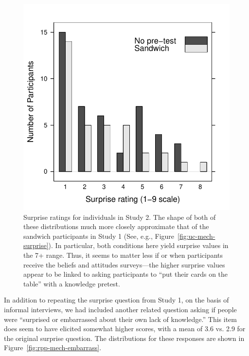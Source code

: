 \begin{figure}
    \centering
    \includegraphics{RPP-mech-surprise-by-group.pdf}
    \caption{Surprise ratings for individuals in Study 2. The shape of both of
        these distributions much more closely approximate that of the sandwich
        participants in Study 1 (See, e.g., Figure~\ref{fig:uc-mech-surprise}).
        In particular, both conditions here yield surprise values in the 7+
        range.  Thus, it seems to matter less if or when participants receive
        the beliefs and attitudes surveys---the higher surprise values appear
        to be linked to asking participants to “put their cards on the table”
        with a knowledge pretest.}
    \label{fig:rpp-mech-surprise}
\end{figure}

In addition to repeating the surprise question from Study 1, on the basis of
informal interviews, we had included another related question asking if people
were “surprised or embarrassed about their own lack of knowledge.” This item
does seem to have elicited somewhat higher scores, with a mean of 3.6 vs. 2.9
for the original surprise question. The distributions for these responses are
shown in Figure~\ref{fig:rpp-mech-embarrass}.

